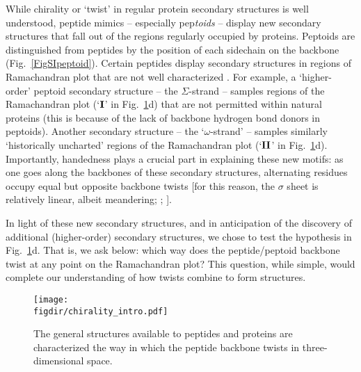 \documentclass[fleqn,10pt]{wlpeerj} %
\newcommand{\Fig}[1]{Fig.~\ref{#1}}
\newcommand{\figdir}{./figures}
\begin{document}
While chirality or `twist' in regular protein secondary structures is well understood, peptide mimics -- especially pep\textit{toids} -- display new secondary structures that fall out of the regions regularly occupied by proteins. Peptoids are distinguished from peptides by the position of each sidechain on the backbone (\Fig{FigSIpeptoid}). Certain peptides display secondary structures in regions of Ramachandran plot that are not well characterized \citep{Sun2013,Goodman2007,Culf2010,Beke2006,Pohl2012,Zuckermann2009,Sun2013}. For example, a `higher-order' peptoid secondary structure -- the $\Sigma$-strand \citep{Mannige2015,Robertson2016} -- samples regions of the Ramachandran plot (`$\textrm{\textbf{I}}$' in \Fig{fig:intro}d) that are not permitted within natural proteins (this is because of the lack of backbone hydrogen bond donors in peptoids). Another secondary structure -- the `$\omega$-strand' \citep{Gorske2016} -- samples similarly `historically uncharted' regions of the Ramachandran plot (`$\textrm{\textbf{II}}$' in \Fig{fig:intro}d). Importantly, handedness plays a crucial part in explaining these new motifs: as one goes along the backbones of these secondary structures, alternating residues occupy equal but opposite backbone twists [for this reason, the $\sigma$ sheet is relatively linear, albeit meandering; \cite{Mannige2015}; \cite{MannigeKunduWhitelam2016}]. 

In light of these new secondary structures, and in anticipation of the discovery of additional (higher-order) secondary structures, we chose to test the hypothesis in \Fig{fig:intro}d. That is, we ask below: which way does the peptide/peptoid backbone twist at any point on the Ramachandran plot? This question, while simple, would complete our understanding of how twists combine to form structures.

\begin{figure}[t!]
\texttt{[image: \\figdir/chirality\_intro.pdf]}
\caption{\label{fig:intro} The general structures available to peptides and proteins are characterized the way in which the peptide backbone twists in three-dimensional space. }
\end{figure}

\end{document}
